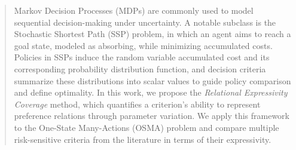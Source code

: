 \documentclass[runningheads]{llncs}
\begin{document}
\begin{abstract}
Markov Decision Processes (MDPs) are commonly used to model sequential decision-making under uncertainty. A notable subclass is the Stochastic Shortest Path (SSP) problem, in which an agent aims to reach a goal state, modeled as absorbing, while minimizing accumulated costs. Policies in SSPs induce the random variable accumulated cost and its corresponding probability distribution function, and decision criteria summarize these distributions into scalar values to guide policy comparison and define optimality.
In this work, we propose the \emph{Relational Expressivity Coverage} method, which quantifies a criterion's ability to represent preference relations through parameter variation. We apply this framework to the One-State Many-Actions (OSMA) problem and compare multiple risk-sensitive criteria from the literature in terms of their expressivity.


\end{abstract}
%
%
\end{document}
